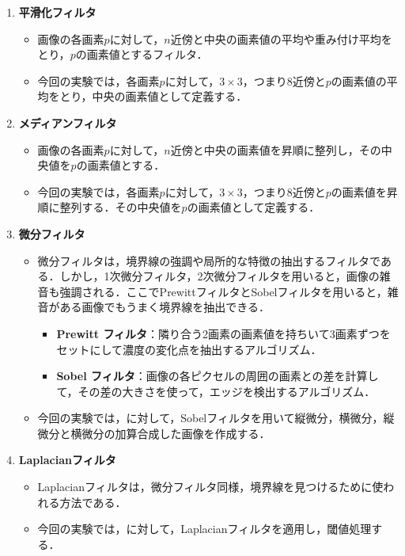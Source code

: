 \begin{enumerate}
    \item \textbf{平滑化フィルタ}
          \begin{itemize}
              \item 画像の各画素\(p\)に対して，\(n\)近傍と中央の画素値の平均や重み付け平均をとり，\(p\)の画素値とするフィルタ．
              \item 今回の実験では，各画素\(p\)に対して，\(3\times 3\)，つまり8近傍と\(p\)の画素値の平均をとり，中央の画素値として定義する．
          \end{itemize}
    \item \textbf{メディアンフィルタ}
          \begin{itemize}
              \item 画像の各画素\(p\)に対して，\(n\)近傍と中央の画素値を昇順に整列し，その中央値を\(p\)の画素値とする．
              \item 今回の実験では，各画素\(p\)に対して，\(3\times 3\)，つまり8近傍と\(p\)の画素値を昇順に整列する．その中央値を\(p\)の画素値として定義する．
          \end{itemize}
    \item \textbf{微分フィルタ}
          \begin{itemize}
              \item 微分フィルタは，境界線の強調や局所的な特徴の抽出するフィルタである．しかし，1次微分フィルタ，2次微分フィルタを用いると，画像の雑音も強調される．ここでPrewittフィルタとSobelフィルタを用いると，雑音がある画像でもうまく境界線を抽出できる\cite[p.87]{画像処理}．
                    \begin{itemize}
                        \item \textbf{Prewitt フィルタ}：隣り合う2画素の画素値を持ちいて3画素ずつをセットにして濃度の変化点を抽出するアルゴリズム\cite[p.87]{画像処理}．
                        \item \textbf{Sobel フィルタ}：画像の各ピクセルの周囲の画素との差を計算して，その差の大きさを使って，エッジを検出するアルゴリズム．
                    \end{itemize}
              \item 今回の実験では，\originimg に対して，Sobelフィルタを用いて縦微分，横微分，縦微分と横微分の加算合成した画像を作成する．
          \end{itemize}
    \item \textbf{Laplacianフィルタ}
          \begin{itemize}
              \item Laplacianフィルタは，微分フィルタ同様，境界線を見つけるために使われる方法である．
              \item 今回の実験では，\originimg に対して，Laplacianフィルタを適用し，閾値処理する．
          \end{itemize}
\end{enumerate}
